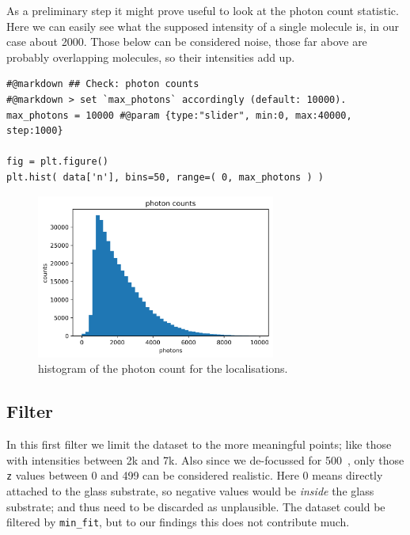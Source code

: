 \documentclass[11pt, a4paper, oneside, twocolumn]{report}
\renewcommand{\tt}{\texttt}
\newcommand{\e}{\emph}
\newcommand{\n}{\textnormal}
\newcommand{\m}{\mathrm}
\begin{document}
As a preliminary step it might prove useful to look at the photon
count statistic. Here we can easily see what the supposed intensity of
a single molecule is, in our case about 2000. Those below can be
considered noise, those far above are probably overlapping molecules,
so their intensities add up.

\begin{verbatim}
#@markdown ## Check: photon counts
#@markdown > set `max_photons` accordingly (default: 10000).
max_photons = 10000 #@param {type:"slider", min:0, max:40000, step:1000}
 
fig = plt.figure()
plt.hist( data['n'], bins=50, range=( 0, max_photons ) )
\end{verbatim}

\begin{figure}[h!]
  \centering
  \includegraphics[width=0.7\textwidth]{3_photons.png}
  \caption{histogram of the photon count for the localisations.}
  \label{f:3_photons}
\end{figure}


\subsection{Filter}

In this first filter we limit the dataset to the more meaningful
points; like those with intensities between 2k and 7k. Also since we
de-focussed for \SI{500}{\n\m}, only those \tt{z} values between 0 and 499 can
be considered realistic. Here 0 means directly attached to the glass
substrate, so negative values would be \e{inside} the glass substrate;
and thus need to be discarded as unplausible. The dataset could be
filtered by \tt{min\_fit}, but to our findings this does not contribute
much.
\end{document}
